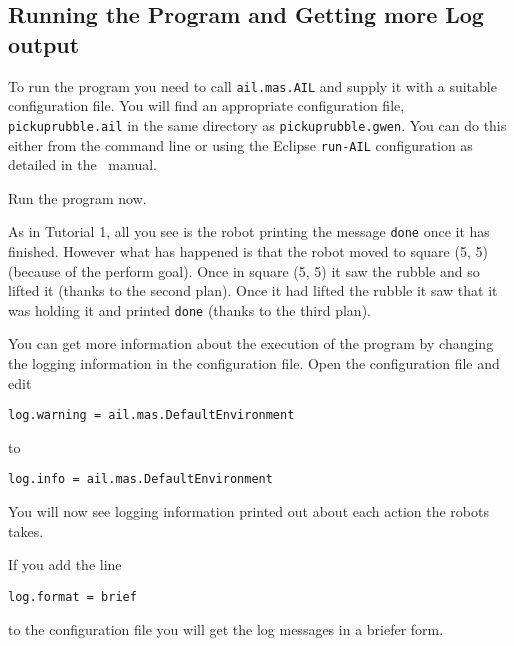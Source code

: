 \subsection{Running the Program and Getting more Log output}

\begin{sloppypar}
To run the program you need to call \texttt{ail.mas.AIL} and supply it with a suitable configuration
file.
You will find an appropriate configuration file,
\texttt{pickuprubble.ail} in the same
directory as \texttt{pickuprubble.gwen}.  You can do this either from
the command line or using the Eclipse \texttt{run-AIL}
configuration as detailed in the \mcapl\ manual.
\end{sloppypar}

Run the program now.

As in Tutorial 1, all you see is the robot
printing the message
\lstinline{done} once it has finished.  However what has happened is
that the robot moved to square (5, 5) (because of the perform
goal).  Once in square (5, 5) it saw
the rubble and so lifted it (thanks to the second plan).
Once it had lifted the rubble it saw that it was holding it and
printed \lstinline{done} (thanks to the third plan).

You can get more information about the execution of the program by
changing the logging information in the configuration file.  Open the
configuration file and
edit
\begin{verbatim}
log.warning = ail.mas.DefaultEnvironment
\end{verbatim}
to
\begin{verbatim}
log.info = ail.mas.DefaultEnvironment
\end{verbatim}
You will now see logging information printed out about each action the robots takes.

If you add the line
\begin{verbatim}
log.format = brief
\end{verbatim}
to the configuration file you will get the log messages in a briefer form.

